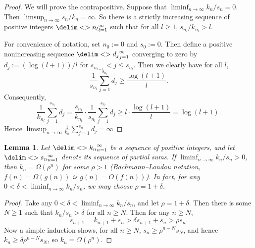 \documentclass[10pt,reqno]{amsart}
\newtheorem{lemma}[theorem]{Lemma}
\theoremstyle{remark}
\newcommand{\seq}{\delim<>}
\numberwithin{equation}{section}
\begin{document}
\begin{proof}
  We will prove the contrapositive.
  Suppose that $\liminf_{n \to \infty} k_n/s_n = 0$.
  Then $\limsup_{n \to \infty} s_n/k_n = \infty$.
  So there is a strictly increasing sequence of positive integers $\seq{n_l}_{l=1}^{\infty}$ such that for all $l \ge 1$, $s_{n_l}/k_{n_l} > l$.

  For convenience of notation, set $n_0 := 0$ and $s_0 := 0$.
  Then define a positive nonincreasing sequence $\seq{d_j}_{j=1}^{\infty}$ converging to zero by $d_j := (\log (l+1))/l$ for $s_{n_{l-1}} < j \le s_{n_l}$.
  Then we clearly have for all $l$,
  \begin{equation*}
    \frac{1}{s_{n_l}} \sum_{j=1}^{s_{n_l}} d_j \ge \frac{\log (l+1)}{l}.
  \end{equation*}
  Consequently,
  \begin{equation*}
    \frac{1}{k_{n_l}} \sum_{j=1}^{s_{n_l}} d_j = \frac{s_{n_l}}{k_{n_l}} \cdot \frac{1}{s_{n_l}} \sum_{j=1}^{s_{n_l}} d_j \ge l \cdot \frac{\log (l+1)}{l} = \log (l+1).
  \end{equation*}
  Hence $\limsup_{n \to \infty} \frac{1}{k_n} \sum_{j=1}^{s_n} d_j = \infty$
\end{proof}

\begin{lemma}
  \label{lem:liminf-ratio-positive-theta-exponential}
  Let $\seq{k_n}_{n=1}^{\infty}$ be a sequence of positive integers, and let $\seq{s_n}_{n=1}^{\infty}$ denote its sequence of partial sums.
  If $\liminf_{n \to \infty} k_n/s_n > 0$, then $k_n = \Omega(\rho^n)$ for some $\rho > 1$ (Bachmann--Landau notation, $f(n) = \Omega(g(n))$ is $g(n) = O(f(n))$).
  In fact, for any $0 < \delta < \liminf_{n \to \infty} k_n/s_n$, we may choose $\rho = 1 + \delta$.
\end{lemma}

\begin{proof}
  Take any $0 < \delta < \liminf_{n \to \infty} k_n/s_n$, and let $\rho = 1 + \delta$.
  Then there is some $N \ge 1$ such that $k_n/s_n > \delta$ for all $n \ge N$.\footnotemark{}
  Then for any $n \ge N$,
  \begin{equation*}
    s_{n+1} = k_{n+1} + s_n > \delta s_{n+1} + s_n > \rho s_n.
  \end{equation*}
  Now a simple induction shows, for all $n \ge N$, $s_n \ge \rho^{n-N} s_N$, and hence $k_n \ge \delta \rho^{n-N} s_N$, so $k_n = \Omega(\rho^n)$.
\end{proof}

\end{document}
